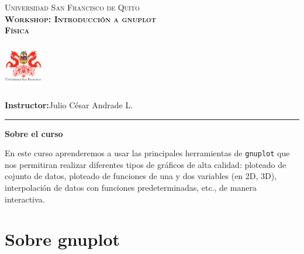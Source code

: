 \documentclass[11.5pt,a4paper]{article}
\begin{document}
\frenchspacing
\begin{center}
	\begin{minipage}{9.4cm}
		\begin{center}
				{\textsc{Universidad San Francisco de Quito}\\
						  \textsc{\textbf{Workshop: Introducción a gnuplot}}\\
						  \textsc{\textbf{Física}} \\
                }
		\end{center}
	\end{minipage}
	    \begin{minipage}{1.8cm}
		\begin{center}
			\includegraphics[width=1.7cm, height=2.0cm]{logo.png}
		\end{center}
	\end{minipage}
\end{center}

\thispagestyle{empty}\bigskip
\setlength{\marginparwidth}{5cm}
\small \noindent \textbf{Instructor:}\hspace{0.3cm}Julio César Andrade L.\\

\thispagestyle{empty}\bigskip

\par\noindent\rule{\textwidth}{0.4pt}
\vspace{0.5cm}
\begin{center}
\textbf{\large Sobre el curso} 
\end{center}
\vspace{0.5cm}

\small
En este curso aprenderemos a usar las principales herramientas de \texttt{gnuplot} que nos permitiran realizar diferentes tipos de gráficos de alta calidad: ploteado de cojunto de datos, ploteado de funciones de una y dos variables (en 2D, 3D), interpolación de datos con funciones predeterminadas, etc., de manera interactiva. 
\vspace{0.5cm}
\normalsize

\section{Sobre gnuplot}
\end{document}
